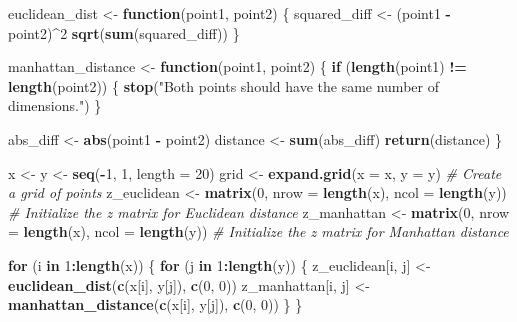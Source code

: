 \documentclass[
]{article}
\newenvironment{Shaded}{\begin{snugshade}}{\end{snugshade}}
\newcommand{\AttributeTok}[1]{\textcolor[rgb]{0.13,0.29,0.53}{#1}}
\newcommand{\CommentTok}[1]{\textcolor[rgb]{0.56,0.35,0.01}{\textit{#1}}}
\newcommand{\ControlFlowTok}[1]{\textcolor[rgb]{0.13,0.29,0.53}{\textbf{#1}}}
\newcommand{\DecValTok}[1]{\textcolor[rgb]{0.00,0.00,0.81}{#1}}
\newcommand{\FunctionTok}[1]{\textcolor[rgb]{0.13,0.29,0.53}{\textbf{#1}}}
\newcommand{\NormalTok}[1]{#1}
\newcommand{\OtherTok}[1]{\textcolor[rgb]{0.56,0.35,0.01}{#1}}
\newcommand{\SpecialCharTok}[1]{\textcolor[rgb]{0.81,0.36,0.00}{\textbf{#1}}}
\newcommand{\StringTok}[1]{\textcolor[rgb]{0.31,0.60,0.02}{#1}}
\begin{document}
\begin{Shaded}
\begin{Highlighting}[]
\NormalTok{euclidean\_dist }\OtherTok{\textless{}{-}} \ControlFlowTok{function}\NormalTok{(point1, point2) \{}
\NormalTok{  squared\_diff }\OtherTok{\textless{}{-}}\NormalTok{ (point1 }\SpecialCharTok{{-}}\NormalTok{ point2)}\SpecialCharTok{\^{}}\DecValTok{2}
  \FunctionTok{sqrt}\NormalTok{(}\FunctionTok{sum}\NormalTok{(squared\_diff))}
\NormalTok{\}}

\NormalTok{manhattan\_distance }\OtherTok{\textless{}{-}} \ControlFlowTok{function}\NormalTok{(point1, point2) \{}
  \ControlFlowTok{if}\NormalTok{ (}\FunctionTok{length}\NormalTok{(point1) }\SpecialCharTok{!=} \FunctionTok{length}\NormalTok{(point2)) \{}
    \FunctionTok{stop}\NormalTok{(}\StringTok{"Both points should have the same number of dimensions."}\NormalTok{)}
\NormalTok{  \}}

\NormalTok{  abs\_diff }\OtherTok{\textless{}{-}} \FunctionTok{abs}\NormalTok{(point1 }\SpecialCharTok{{-}}\NormalTok{ point2)}
\NormalTok{  distance }\OtherTok{\textless{}{-}} \FunctionTok{sum}\NormalTok{(abs\_diff)}
  \FunctionTok{return}\NormalTok{(distance)}
\NormalTok{\}}

\NormalTok{x }\OtherTok{\textless{}{-}}\NormalTok{ y }\OtherTok{\textless{}{-}} \FunctionTok{seq}\NormalTok{(}\SpecialCharTok{{-}}\DecValTok{1}\NormalTok{, }\DecValTok{1}\NormalTok{, }\AttributeTok{length =} \DecValTok{20}\NormalTok{)}
\NormalTok{grid }\OtherTok{\textless{}{-}} \FunctionTok{expand.grid}\NormalTok{(}\AttributeTok{x =}\NormalTok{ x, }\AttributeTok{y =}\NormalTok{ y)  }\CommentTok{\# Create a grid of points}
\NormalTok{z\_euclidean }\OtherTok{\textless{}{-}} \FunctionTok{matrix}\NormalTok{(}\DecValTok{0}\NormalTok{, }\AttributeTok{nrow =} \FunctionTok{length}\NormalTok{(x), }\AttributeTok{ncol =} \FunctionTok{length}\NormalTok{(y))  }\CommentTok{\# Initialize the z matrix for Euclidean distance}
\NormalTok{z\_manhattan }\OtherTok{\textless{}{-}} \FunctionTok{matrix}\NormalTok{(}\DecValTok{0}\NormalTok{, }\AttributeTok{nrow =} \FunctionTok{length}\NormalTok{(x), }\AttributeTok{ncol =} \FunctionTok{length}\NormalTok{(y))   }\CommentTok{\# Initialize the z matrix for Manhattan distance}

\ControlFlowTok{for}\NormalTok{ (i }\ControlFlowTok{in} \DecValTok{1}\SpecialCharTok{:}\FunctionTok{length}\NormalTok{(x)) \{}
  \ControlFlowTok{for}\NormalTok{ (j }\ControlFlowTok{in} \DecValTok{1}\SpecialCharTok{:}\FunctionTok{length}\NormalTok{(y)) \{}
\NormalTok{    z\_euclidean[i, j] }\OtherTok{\textless{}{-}} \FunctionTok{euclidean\_dist}\NormalTok{(}\FunctionTok{c}\NormalTok{(x[i], y[j]), }\FunctionTok{c}\NormalTok{(}\DecValTok{0}\NormalTok{, }\DecValTok{0}\NormalTok{))}
\NormalTok{    z\_manhattan[i, j] }\OtherTok{\textless{}{-}} \FunctionTok{manhattan\_distance}\NormalTok{(}\FunctionTok{c}\NormalTok{(x[i], y[j]), }\FunctionTok{c}\NormalTok{(}\DecValTok{0}\NormalTok{, }\DecValTok{0}\NormalTok{))}
\NormalTok{  \}}
\NormalTok{\}}


\end{Highlighting}
\end{Shaded}
\end{document}
